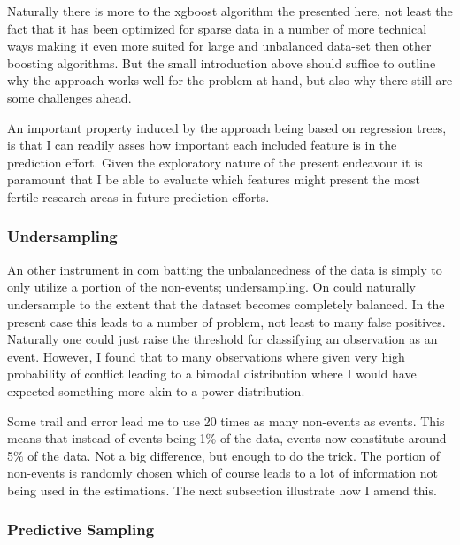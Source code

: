 \documentclass[a4paper]{article}
\begin{document}
Naturally there is more to the xgboost algorithm the presented here, not least the fact that it has been optimized for sparse data in a number of more technical ways making it even more suited for large and unbalanced data-set then other boosting algorithms\cite[5]{Chen_2016}. But the small introduction above should suffice to outline why the approach works well for the problem at hand, but also why there still are some challenges ahead. \par

An important property induced by the approach being based on regression trees, is that I can readily asses how important each included feature is in the prediction effort. Given the exploratory nature of the present endeavour it is paramount that I be able to evaluate which features might present the most fertile research areas in future prediction efforts.\par

\subsubsection{Undersampling}

An other instrument in com batting the unbalancedness of the data is simply to only utilize a portion of the non-events; undersampling. On could naturally undersample to the extent that the dataset becomes completely balanced. In the present case this leads to a number of problem, not least to many false positives. Naturally one could just raise the threshold for classifying an observation as an event. However, I found that to many observations where given very high probability of conflict leading to a bimodal distribution where I would have expected something more akin to a power distribution.\par %

Some trail and error lead me to use 20 times as many non-events as events. This means that instead of events being 1\% of the data, events now constitute around 5\% of the data. Not a big difference, but enough to do the trick. The portion of non-events is randomly chosen which of course leads to a lot of information not being used in the estimations. The next subsection illustrate how I amend this.\par

\subsubsection{Predictive Sampling}
\end{document}
